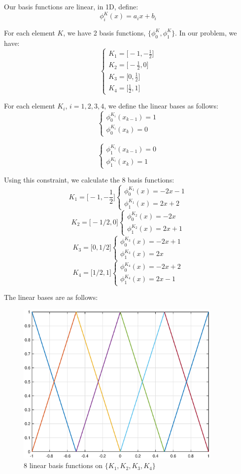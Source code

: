 \documentclass[12pt]{article} %
\newcommand{\1}[1]{\mathds{1}\left[#1\right]}
\begin{document}
Our basis functions are linear, in 1D, define:
$$
	\phi_{i}^K(x) = a_ix+b_i
$$

For each element $K$, we have 2 basis functions, $\{\phi_0^K, \phi_1^K\}$. In our problem, we have:
$$
\begin{cases}
	K_1 = \big[-1,-\frac12\big]\\
	K_2 = \big[-\frac12,0\big]\\
	K_3 = \big[0,\frac12\big]\\
	K_4 = \big[\frac12,1\big]
\end{cases}
$$

For each element $K_i$, $i =1,2,3,4$, we define the linear bases as follows:
$$
\begin{cases}
	\phi_0^{K_i}(x_{k-1}) = 1 \\
	\phi_0^{K_i}(x_{k}) = 0
\end{cases}
$$

$$
\begin{cases}
	\phi_1^{K_i}(x_{k-1}) = 0 \\
	\phi_1^{K_i}(x_{k}) = 1
\end{cases}
$$

Using this constraint, we calculate the 8 basis functions:
$$
	K_1 = \big[-1,-\frac12\big]
	\begin{cases}
		\phi_0^{K_1}(x) = -2x-1 \\
		\phi_1^{K_1}(x) = 2x+2
	\end{cases}
$$
$$
	K_2 = \big[-1/2,0\big]
	\begin{cases}
		\phi_0^{K_2}(x) = -2x \\
		\phi_1^{K_2}(x) = 2x+1
	\end{cases}
$$
$$
	K_3 = \big[0,1/2\big]
	\begin{cases}
		\phi_0^{K_3}(x) = -2x+1\\
		\phi_1^{K_3}(x) = 2x
	\end{cases}
$$
$$
	K_4 = \big[1/2,1\big]
	\begin{cases}
		\phi_0^{K_4}(x) = -2x+2\\
		\phi_1^{K_4}(x) = 2x-1
	\end{cases}
$$

The linear bases are as follows:
\newpage
\begin{figure}[t]
\includegraphics[width=10cm]{linear_basis.eps}
\centering
\caption{8 linear basis functions on $\{K_1,K_2,K_3,K_4\}$}
\end{figure}
\end{document}
